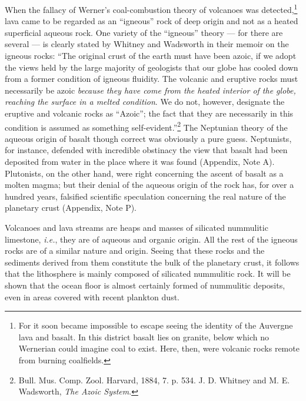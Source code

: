 \documentclass[a4paper, 12pt, oneside, landscape]{article}
\begin{document}
When the fallacy of Werner's coal-combustion theory of volcanoes was detected,\footnote{For it soon became impossible to escape seeing the identity of the Auvergne lava and basalt. In this district basalt lies on granite, below which no Wernerian could imagine coal to exist. Here, then, were volcanic rocks remote from burning coalfields.} lava came to be regarded as an ``igneous'' rock of deep origin and not as a heated superficial aqueous rock. One variety of the ``igneous'' theory --- for there are several --- is clearly stated by Whitney and Wadsworth in their memoir on the igneous rocks: ``The original crust of the earth must have been azoic, if we adopt the views held by the large majority of geologists that our globe has cooled down from a former condition of igneous fluidity. The volcanic and eruptive rocks must necessarily be azoic \emph{because they have come from the heated interior of the globe, reaching the surface in a melted condition}. We do not, however, designate the eruptive and volcanic rocks as ``Azoic''; the fact that they are necessarily in this condition is assumed as something self-evident.''\footnote{Bull. Mus. Comp. Zool. Harvard, 1884, 7. p. 534. J. D. Whitney and M. E. Wadsworth, \emph{The Azoic System}.} The Neptunian theory of the aqueous origin of basalt though correct was obviously a pure guess. Neptunists, for instance, defended with incredible obstinacy the view that basalt had been deposited from water in the place where it was found (Appendix, Note A). Plutonists, on the other hand, were right concerning the ascent of basalt as a molten magma; but their denial of the aqueous origin of the rock has, for over a hundred years, falsified scientific speculation concerning the real nature of the planetary crust (Appendix, Note P).

Volcanoes and lava streams are heaps and masses of silicated nummulitic limestone, \emph{i.e.}, they are of aqueous and organic origin. All the rest of the igneous rocks are of a similar nature and origin. Seeing that these rocks and the sediments derived from them constitute the bulk of the planetary crust, it follows that the lithosphere is mainly composed of silicated nummulitic rock. It will be shown that the ocean floor is almost certainly formed of nummulitic deposits, even in areas covered with recent plankton dust.
\end{document}
